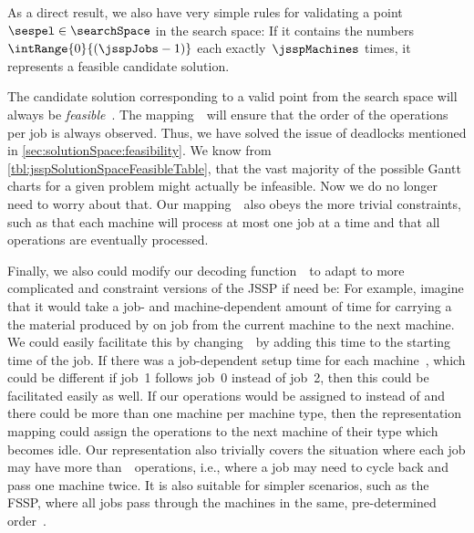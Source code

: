As a direct result, we also have very simple rules for validating a point~$\sespel\in\searchSpace$ in the search space:
If it contains the numbers~$\intRange{0}{(\jsspJobs-1)}$ each exactly~$\jsspMachines$ times, it represents a feasible candidate solution.

The candidate solution corresponding to a valid point from the search space will always be \emph{feasible}~\cite{B1995AGPATJSSWGA}.
The mapping~\decode\ will ensure that the order of the operations per job is always observed.
Thus, we have solved the issue of deadlocks mentioned in \autoref{sec:solutionSpace:feasibility}.
We know from \autoref{tbl:jsspSolutionSpaceFeasibleTable}, that the vast majority of the possible Gantt charts for a given problem might actually be infeasible.
Now we do no longer need to worry about that.
Our mapping~\decode\ also obeys the more trivial constraints, such as that each machine will process at most one job at a time and that all operations are eventually processed.

Finally, we also could modify our decoding function~\decode\ to adapt to more complicated and constraint versions of the \gls{JSSP} if need be:
For example, imagine that it would take a job- and machine-dependent amount of time for carrying a the material produced by on job from the current machine to the next machine.
We could easily facilitate this by changing~\decode\ by adding this time to the starting time of the job.
If there was a job-dependent setup time for each machine~\cite{ANCK2008ASOSPWSTOC}, which could be different if job~1 follows job~0 instead of job~2, then this could be facilitated easily as well.
If our operations would be assigned to  instead of  and there could be more than one machine per machine type, then the representation mapping could assign the operations to the next machine of their type which becomes idle.
Our representation also trivially covers the situation where each job may have more than~\jsspMachines\ operations, i.e., where a job may need to cycle back and pass one machine twice.
It is also suitable for simpler scenarios, such as the \acrfull{FSSP}, where all jobs pass through the machines in the same, pre-determined order~\cite{T1993BFBSP,GJS1976TCOFAJS,W2013GAFSSPAS}.

